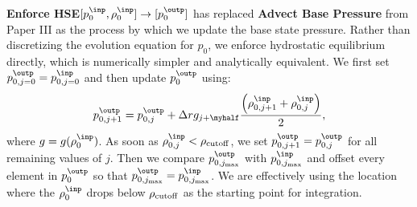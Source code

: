 {\bf Enforce HSE}$[p_0^{\inp},\rho_0^{\inp}]
  \rightarrow [p_0^{\outp}]$ has replaced {\bf Advect Base Pressure}
  from Paper III as the process by which we update the base state
  pressure.  Rather than discretizing the evolution equation for
  $p_0$, we enforce hydrostatic equilibrium directly, which is numerically simpler
  and analytically equivalent.  We first set 
  $p_{0,j=0}^{\outp} = p_{0,j=0}^{\inp}$ and then update $p_0^\outp$ using:
\begin{equation}
p_{0,j+1}^{\outp} = p_{0,j}^{\outp} + \Delta r g_{j+\myhalf}\frac{\left(\rho_{0,j+1}^{\inp}+\rho_{0,j}^{\inp}\right)}{2},
\end{equation}
  where $g=g(\rho_0^\inp)$.  As soon as $\rho_{0,j}^\inp < \rho_{\rm cutoff}$, we set 
  $p_{0,j+1}^\outp = p_{0,j}^\outp$ for all remaining values of $j$.  
  Then we compare $p_{0,j_{\rm max}}^\outp$ with $p_{0,j_{\rm max}}^\inp$ and offset
  every element in $p_0^\outp$ so that $p_{0,j_{\rm max}}^\outp = p_{0,j_{\rm max}}^\inp$.  
  We are effectively using the location where the $\rho_0^\inp$ drops below 
  $\rho_{\rm cutoff}$ as the starting point for integration.


